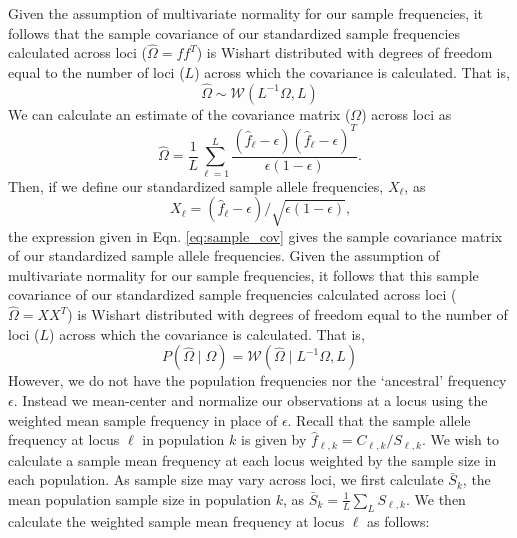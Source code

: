 \documentclass[12pt]{article}
\begin{document}
Given the assumption of multivariate normality for our sample frequencies, it follows that the sample covariance of our standardized sample frequencies calculated across loci ($\widehat{\Omega} = f f^T$)  is Wishart distributed with degrees of freedom equal to the number of loci ($L$) across which the covariance is calculated.
That is, 
%
\begin{equation}
\widehat{\Omega} \sim \mathcal{W}\left( L^{-1} \Omega, L	\right)
\end{equation}
%
We can calculate an estimate of the covariance matrix ($\Omega$) across loci as 
%
\begin{equation}
\widehat{\Omega} = \frac{1}{L} \sum_{\ell=1}^{L} \frac{(\hat{f}_{\ell}  - \epsilon) (\hat{f}_{\ell}  - \epsilon)^T}{\epsilon(1-\epsilon)} \text{.}
\end{equation}
%
Then, if we define our standardized sample allele frequencies, $X_\ell$, as
%
\begin{equation}
X_\ell = (\hat{f}_{\ell}  - \epsilon)/\sqrt{\epsilon(1-\epsilon)}\text{,}
\end{equation}
%
the expression given in Eqn. \eqref{eq:sample_cov} gives the sample covariance matrix of our standardized sample allele frequencies.
Given the assumption of multivariate normality for our sample frequencies, it follows that this sample covariance of our standardized sample frequencies calculated across loci ($\widehat{\Omega} = X X^T$)  is Wishart distributed with degrees of freedom equal to the number of loci ($L$) across which the covariance is calculated.
That is, 
%
\begin{equation}
P(\widehat{\Omega} \mid \Omega) = \mathcal{W}\left(\widehat{\Omega} \mid L^{-1} \Omega,L \right)
\end{equation}
%
However, we do not have the population frequencies nor the `ancestral' frequency $\epsilon$. Instead we mean-center and normalize our observations at a locus using the weighted mean sample frequency in place of $\epsilon$.  Recall that the sample allele frequency at locus $\ell$ in population $k$ is given by $\hat{f}_{\ell,k} = C_{\ell,k}/S_{\ell,k}$.  We wish to calculate a sample mean frequency at each locus weighted by the sample size in each population.  As sample size may vary across loci, we first calculate $\bar{S}_k$, the mean population sample size in population $k$, as $\bar{S}_k = \frac{1}{L}\sum_L S_{\ell,k}$.  We then calculate the weighted sample mean frequency at locus $\ell$ as follows:
\end{document}

